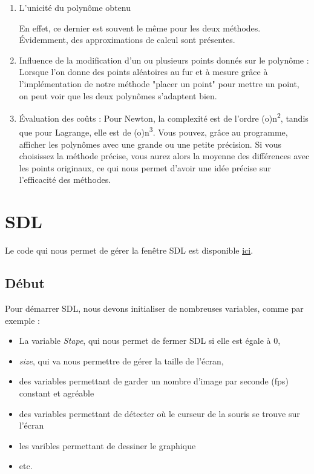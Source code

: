 \documentclass[letter]{article}
\begin{document}
\begin{enumerate}
\item L'unicité du polynôme obtenu

En effet, ce dernier est souvent le même pour les deux méthodes. Évidemment, des approximations de calcul sont présentes.

\item Influence de la modification d'un ou plusieurs points donnés sur le polynôme :
Lorsque l'on donne des points aléatoires au fur et à mesure grâce à l'implémentation de notre méthode "placer un point" pour mettre un point, on peut voir que les deux polynômes s'adaptent bien.

\item Évaluation des coûts :
Pour Newton, la complexité est de l'ordre (o)n\textsuperscript{2}, tandis que pour Lagrange, elle est de (o)n\textsuperscript{3}. 
Vous pouvez, grâce au programme, afficher les polynômes avec une grande ou une petite précision. Si vous choisissez la méthode précise, vous aurez alors la moyenne des différences avec les points originaux, ce qui nous permet d'avoir une idée précise sur l’efficacité des méthodes.
\end{enumerate}

\newpage
\section{SDL}
\label{sec:org621e065}

Le code qui nous permet de gérer la fenêtre SDL est disponible \href{render.c}{ici}.

\subsection{Début}
\label{sec:orgaa267a8}

Pour démarrer SDL, nous devons initialiser de nombreuses variables, comme par exemple :

\begin{itemize}
\item La variable \emph{Stape}, qui nous permet de fermer SDL si elle est égale à 0,
\item \emph{size}, qui va nous permettre de gérer la taille de l'écran,
\item des variables permettant de garder un nombre d'image par seconde (fps) constant et agréable
\item des variables permettant de détecter où le curseur de la souris se trouve sur l'écran
\item les varibles permettant de dessiner le graphique
\item etc.
\end{itemize}
\end{document}

